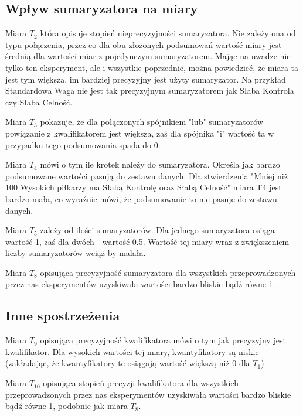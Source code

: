 \documentclass{classrep}
\begin{document}
\subsection{Wpływ sumaryzatora na miary}
Miara $T_2$ która opisuje stopień nieprecyzyjności sumaryzatora. Nie zależy ona od typu połączenia, przez co dla obu złożonych podsumowań wartość miary jest średnią dla wartości miar z pojedynczym sumaryzatorem. Mając na uwadze nie tylko ten eksperyment, ale i wszystkie poprzednie, można powiedzieć, że miara ta jest tym większa, im bardziej precyzyjny jest użyty sumaryzator. Na przykład Standardowa Waga nie jest tak precyzyjnym sumaryzatorem jak Słaba Kontrola czy Słaba Celność.
\newline

Miara $T_3$ pokazuje, że dla połączonych spójnikiem "lub" sumaryzatorów powiązanie z kwalifikatorem jest większa, zaś dla spójnika "i" wartość ta w przypadku tego podsumowania spada do 0.
\newline

Miara $T_4$ mówi o tym ile krotek należy do sumaryzatora. Określa jak bardzo podsumowane wartości pasują do zestawu danych. Dla stwierdzenia "Mniej niż 100 Wysokich piłkarzy ma Słabą Kontrolę oraz Słabą Celność" miara T4 jest bardzo mała, co wyraźnie mówi, że podsumowanie to nie pasuje do zestawu danych.
\newline

Miara $T_5$ zależy od ilości sumaryzatorów. Dla jednego sumaryzatora osiąga wartość 1, zaś dla dwóch - wartość 0.5. Wartość tej miary wraz z zwiększeniem liczby sumaryzatorów wciąż by malała. 
\newline

Miara $T_8$ opisująca precyzyjność sumaryzatora dla wszystkich przeprowadzonych przez nas eksperymentów uzyskiwała wartości bardzo bliskie bądź równe 1. 

\subsection{Inne spostrzeżenia}
Miara $T_9$ opisująca precyzyjność kwalifikatora mówi o tym jak precyzyjny jest kwalifikator. Dla wysokich wartości tej miary, kwantyfikatory są niskie (zakładając, że kwantyfikatory te osiągają wartość większą niż 0 dla $T_1$).
\newline

Miara $T_{10}$ opisująca stopień precyzji kwalifikatora dla wszystkich przeprowadzonych przez nas eksperymentów uzyskiwała wartości bardzo bliskie bądź równe 1, podobnie jak miara $T_8$. 
\newline
\end{document}
